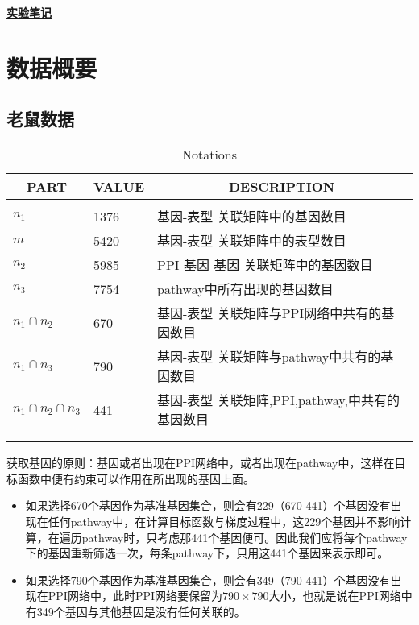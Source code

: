 \documentclass{ctexart}
\begin{document}
\setlength{\parindent}{0pt}
\begin{center}
  \uline{\textbf{实验笔记}}
\end{center}
\section{数据概要}
\subsection{老鼠数据}
\begin{table}[h]
\caption{Notations}
\label{sample-table}
\begin{center}
\begin{tabular}{lll}
\multicolumn{1}{c}{\bf PART}&\multicolumn{1}{c}{\bf VALUE}  &\multicolumn{1}{c}{\bf DESCRIPTION}
\\ \hline \\
$n_1$    &1376      &基因-表型 关联矩阵中的基因数目 \\
$m$    &5420      &基因-表型 关联矩阵中的表型数目 \\
$n_2$    &5985      &PPI 基因-基因 关联矩阵中的基因数目 \\
$n_3$    &7754      &pathway中所有出现的基因数目 \\
$n_1\cap n_2$    &670      &基因-表型 关联矩阵与PPI网络中共有的基因数目 \\
$n_1\cap n_3$    &790      &基因-表型 关联矩阵与pathway中共有的基因数目 \\
$n_1\cap n_2\cap n_3$    &441      &基因-表型 关联矩阵,PPI,pathway,中共有的基因数目 \\
\\ \hline \\
\end{tabular}
\end{center}
\end{table}

获取基因的原则：基因或者出现在PPI网络中，或者出现在pathway中，这样在目标函数中便有约束可以作用在所出现的基因上面。\\

\begin{itemize}
\item 如果选择670个基因作为基准基因集合，则会有229（670-441）个基因没有出现在任何pathway中，在计算目标函数与梯度过程中，这229个基因并不影响计算，在遍历pathway时，只考虑那441个基因便可。因此我们应将每个pathway下的基因重新筛选一次，每条pathway下，只用这441个基因来表示即可。
\item 如果选择790个基因作为基准基因集合，则会有349（790-441）个基因没有出现在PPI网络中，此时PPI网络要保留为$790\times 790$大小，也就是说在PPI网络中有349个基因与其他基因是没有任何关联的。
\end{itemize}
\end{document}
